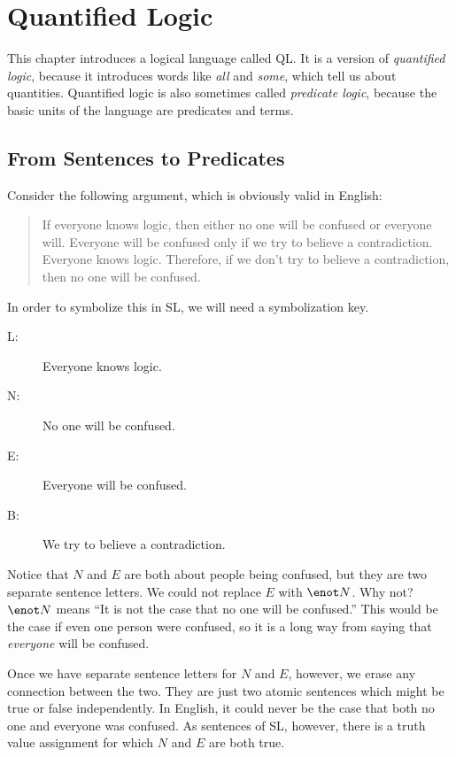 \chapter{Quantified Logic}\label{ch:QL}

This chapter introduces a logical language called QL. It is a version of \emph{quantified logic}, because it introduces words like \emph{all} and \emph{some}, which tell us about quantities. Quantified logic is also sometimes called \emph{predicate logic}, because the basic units of the language are predicates and terms.

\section{From Sentences to Predicates}


Consider the following argument, which is obviously valid in English:

\begin{quote}
If everyone knows logic, then either no one will be confused or everyone will. Everyone will be confused only if we try to believe a contradiction. Everyone knows logic.
Therefore, if we don't try to believe a contradiction, then no one will be confused.
\end{quote}

In order to symbolize this in SL, we will need a symbolization key. 
\begin{description}
\item[L:] Everyone knows logic.
\item[N:] No one will be confused.
\item[E:] Everyone will be confused.
\item[B:] We try to believe a contradiction.
\end{description}
Notice that $N$ and $E$ are both about people being confused, but they are two separate sentence letters. We could not replace $E$ with $\enot N$. Why not? $\enot N$ means ``It is not the case that no one will be confused.'' This would be the case if even one person were confused, so it is a long way from saying that \emph{everyone} will be confused.

Once we have separate sentence letters for $N$ and $E$, however, we erase any connection between the two. They are just two atomic sentences which might be true or false independently. In English, it could never be the case that both no one and everyone was confused. As sentences of SL, however, there is a truth value assignment for which $N$ and $E$ are both true.

